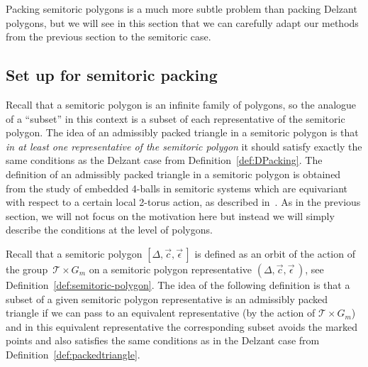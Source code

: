 \documentclass[10pt,a4paper]{amsart}
\numberwithin{equation}{section}
\newcommand{\De}{\Delta}
\newcommand{\stpoly}{[\De,\vec{c},\vec{\epsilon}\,]}
\newcommand{\strep}{(\De,\vec{c},\vec{\epsilon}\,)}
\theoremstyle{definition}
\theoremstyle{plain}
\theoremstyle{plain}
\begin{document}
Packing semitoric polygons is a much more subtle problem than packing Delzant polygons, but we will see in this section that we can carefully adapt our methods from the previous section to the semitoric case.


\subsection{Set up for semitoric packing}
\label{sec:semitoric-setup}

Recall that a semitoric polygon is an infinite family of polygons, so the analogue of a ``subset'' in this context is a subset of each representative of the semitoric polygon.
The idea of an admissibly packed triangle in a semitoric polygon is that \textit{in at least one representative of the semitoric polygon} it should satisfy exactly the same conditions as the Delzant case from Definition~\ref{def:DPacking}.
The definition of an admissibly packed triangle in a semitoric polygon is obtained from the study of embedded 4-balls in semitoric systems which are equivariant with respect to a certain local 2-torus action, as described in~\cite{FiPaPe2016}.
As in the previous section, we will not focus on the motivation here but instead we will simply describe the conditions at the level of polygons.



Recall that a semitoric polygon $\stpoly$ is defined as an orbit of the action of the group~$\mathcal{T}\times G_m$ on a semitoric polygon representative $\strep$, see Definition~\ref{def:semitoric-polygon}.
The idea of the following definition is that a subset of a given semitoric polygon representative is an admissibly packed triangle if we can pass to an equivalent representative (by the action of $\mathcal{T}\times G_m$) and in this equivalent representative the corresponding subset avoids the marked points and also satisfies the same conditions as in the Delzant case from Definition~\ref{def:packedtriangle}.
\end{document}
